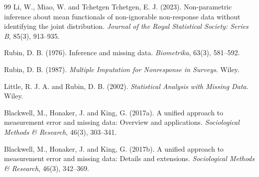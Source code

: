 \documentclass[10pt,a4paper]{article}
\newcommand{\1}{\mathbf{1}}
\begin{document}
\begin{thebibliography}{99}
Li, W., Miao, W. and Tchetgen Tchetgen, E. J. (2023).
Non-parametric inference about mean functionals of non-ignorable non-response data without identifying the joint distribution.
\textit{Journal of the Royal Statistical Society: Series B}, 85(3), 913--935.

Rubin, D. B. (1976).
Inference and missing data.
\textit{Biometrika}, 63(3), 581--592.

Rubin, D. B. (1987).
\textit{Multiple Imputation for Nonresponse in Surveys}.
Wiley.

Little, R. J. A. and Rubin, D. B. (2002).
\textit{Statistical Analysis with Missing Data}.
Wiley.

Blackwell, M., Honaker, J. and King, G. (2017a).
A unified approach to measurement error and missing data: Overview and applications.
\textit{Sociological Methods \& Research}, 46(3), 303--341.

Blackwell, M., Honaker, J. and King, G. (2017b).
A unified approach to measurement error and missing data: Details and extensions.
\textit{Sociological Methods \& Research}, 46(3), 342--369.

\end{thebibliography}
\fi
\end{document}
